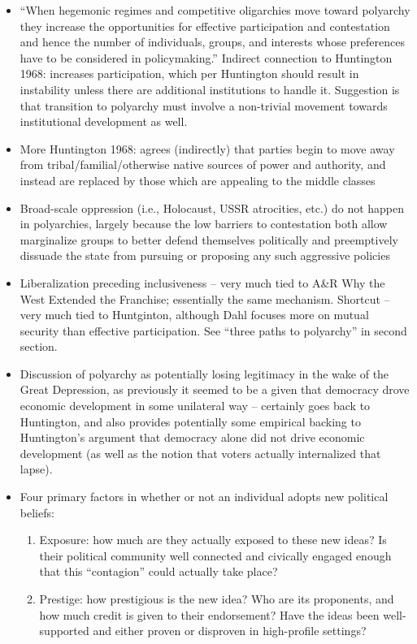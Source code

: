 \documentclass[12pt]{article}
\begin{document}
\begin{itemize}
    \item ``When hegemonic regimes and competitive oligarchies move toward polyarchy they increase the opportunities for effective participation and contestation and hence the number of individuals, groups, and interests whose preferences have to be considered in policymaking.'' Indirect connection to Huntington 1968: increases participation, which per Huntington should result in instability unless there are additional institutions to handle it. Suggestion is that transition to polyarchy must involve a non-trivial movement towards institutional development as well.
    \item More Huntington 1968: agrees (indirectly) that parties begin to move away from tribal/familial/otherwise native sources of power and authority, and instead are replaced by those which are appealing to the middle classes
    \item Broad-scale oppression (i.e., Holocaust, USSR atrocities, etc.) do not happen in polyarchies, largely because the low barriers to contestation both allow marginalize groups to better defend themselves politically and preemptively dissuade the state from pursuing or proposing any such aggressive policies
    \item Liberalization preceding inclusiveness -- very much tied to A\&R Why the West Extended the Franchise; essentially the same mechanism. Shortcut -- very much tied to Huntginton, although Dahl focuses more on mutual security than effective participation. See ``three paths to polyarchy'' in second section.
    \item Discussion of polyarchy as potentially losing legitimacy in the wake of the Great Depression, as previously it seemed to be a given that democracy drove economic development in some unilateral way -- certainly goes back to Huntington, and also provides potentially some empirical backing to Huntington's argument that democracy alone did not drive economic development (as well as the notion that voters actually internalized that lapse).
    \item Four primary factors in whether or not an individual adopts new political beliefs:
    \begin{enumerate}
        \item Exposure: how much are they actually exposed to these new ideas? Is their political community well connected and civically engaged enough that this ``contagion'' could actually take place?
        \item Prestige: how prestigious is the new idea? Who are its proponents, and how much credit is given to their endorsement? Have the ideas been well-supported and either proven or disproven in high-profile settings?

\end{enumerate}
\end{itemize}
\end{document}
